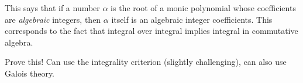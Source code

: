 \begin{remark}

This says that if a number \(\alpha\) is the root of a monic polynomial
whose coefficients are \emph{algebraic} integers, then \(\alpha\) itself
is an algebraic integer coefficients. This corresponds to the fact that
integral over integral implies integral in commutative algebra.

\end{remark}

\begin{exercise}

Prove this! Can use the integrality criterion (slightly challenging),
can also use Galois theory.

\end{exercise}

\cleardoublepage

\renewcommand{\listtheoremname}{}
\listoftheorems[ignoreall,show={definition}, numwidth=3.5em]
\cleardoublepage

\renewcommand{\listtheoremname}{}
\listoftheorems[ignoreall,show={theorem,proposition}, numwidth=3.5em]
\cleardoublepage

\renewcommand{\listtheoremname}{}
\listoftheorems[ignoreall,show={exercise}, numwidth=3.5em]
\cleardoublepage

\listoffigures
\cleardoublepage


\printbibliography[title=Bibliography]



